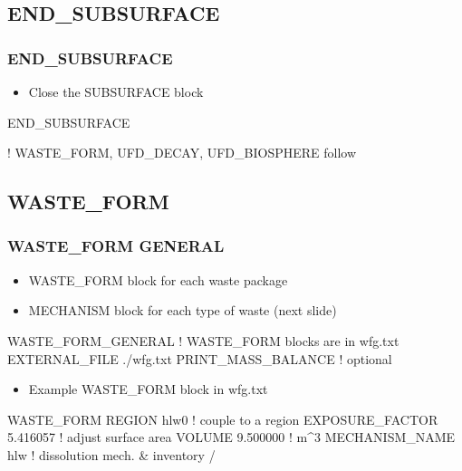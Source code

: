 \documentclass{beamer}
\newcommand\redcomment[1]{{{\color{red} #1}}}
\newcommand\bluecomment[1]{{{\color{blue} #1}}}
\newcommand\greencomment[1]{{{\color{green} #1}}}
\begin{document}
\subsection{END\_SUBSURFACE}
\begin{frame}[fragile]\frametitle{END\_SUBSURFACE}

\begin{itemize}
  \item Close the SUBSURFACE block
\end{itemize}

\begin{semiverbatim}
END_SUBSURFACE 

\bluecomment{! WASTE_FORM, UFD_DECAY, UFD_BIOSPHERE follow}
\end{semiverbatim}
\end{frame}

\subsection{WASTE\_FORM}
\begin{frame}[fragile]\frametitle{WASTE\_FORM GENERAL}

\begin{itemize}
  \item \redcomment{WASTE\_FORM} block for each waste package
  \item \redcomment{MECHANISM} block for each type of waste (next slide)
\end{itemize}

\begin{semiverbatim}\small
WASTE_FORM_GENERAL
  \bluecomment{! WASTE_FORM blocks are in} \greencomment{wfg.txt}
  EXTERNAL_FILE ./wfg.txt
  PRINT_MASS_BALANCE \bluecomment{! optional}
\end{semiverbatim}

\begin{itemize}\small
  \item Example \redcomment{WASTE\_FORM} block in \greencomment{wfg.txt}
\end{itemize}

\begin{semiverbatim}
  WASTE_FORM
     REGION hlw0              \bluecomment{! couple to a region}
     EXPOSURE_FACTOR 5.416057 \bluecomment{! adjust surface area}
     VOLUME 9.500000 \bluecomment{! m^3}
     MECHANISM_NAME hlw \bluecomment{! dissolution mech. & inventory}
  /
\end{semiverbatim}
\end{frame}
\end{document}
